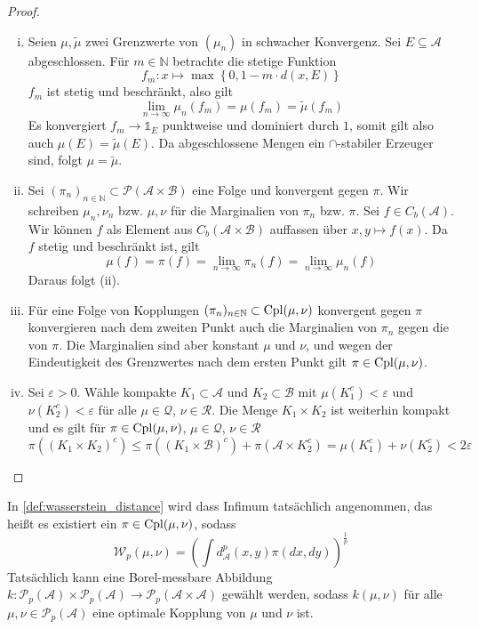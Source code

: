 \begin{proof}
\begin{enumerate}[(i)]
    \item Seien $\mu, \tilde{\mu}$ zwei Grenzwerte von $(\mu_n)$ in schwacher Konvergenz. Sei $E \subseteq \mathcal{A}$ abgeschlossen. Für $m \in \mathbb{N}$ betrachte die stetige Funktion 
    $$f_m: x \mapsto \max\left\{0, 1-m\cdot d(x,E)\right\}$$
    $f_m$ ist stetig und beschränkt, also gilt 
    $$\lim_{n \rightarrow \infty} \mu_n(f_m) = \mu(f_m) = \tilde{\mu}(f_m)$$
    Es konvergiert $f_m \rightarrow \mathds{1}_E$ punktweise und dominiert durch $1$, somit gilt also auch $\mu(E) =\tilde{\mu}(E)$. Da abgeschlossene Mengen ein $\cap$-stabiler Erzeuger sind, folgt $\mu=\tilde{\mu}$.

    \item Sei $(\pi_n)_{n\in\mathbb{N}} \subset \mathcal{P}(\mathcal{A}\times\mathcal{B})$ eine Folge und konvergent gegen $\pi$. Wir schreiben $\mu_n, \nu_n$ bzw. $\mu, \nu$ für die Marginalien von $\pi_n$ bzw. $\pi$. Sei $f\in C_b(\mathcal{A})$. Wir können $f$ als Element aus $C_b(\mathcal{A}\times\mathcal{B})$ auffassen über $x,y\mapsto f(x)$. Da $f$ stetig und beschränkt ist, gilt 
    $$\mu(f) = \pi(f) = \lim_{n\rightarrow \infty} \pi_n(f) = \lim_{n\rightarrow\infty} \mu_n(f)$$ 
    Daraus folgt (ii).

    \item Für eine Folge von Kopplungen $(\pi_n)_{n\in\mathbb{N}} \subset \operatorname{Cpl}(\mu,\nu)$ konvergent gegen $\pi$ konvergieren nach dem zweiten Punkt auch die Marginalien von $\pi_n$ gegen die von $\pi$. Die Marginalien sind aber konstant $\mu$ und $\nu$, und wegen der Eindeutigkeit des Grenzwertes nach dem ersten Punkt gilt $\pi \in \operatorname{Cpl}(\mu,\nu)$.

    \item Sei $\varepsilon > 0$. Wähle kompakte $K_1 \subset \mathcal{A}$ und $K_2 \subset \mathcal{B}$ mit $\mu(K_1^c)<\varepsilon$ und $\nu(K_2^c) < \varepsilon$ für alle $\mu \in \mathcal{Q}$, $\nu \in \mathcal{R}$. Die Menge $K_1 \times K_2$ ist weiterhin kompakt und es gilt für $\pi \in \operatorname{Cpl}(\mu,\nu)$, $\mu \in \mathcal{Q}$, $\nu\in\mathcal{R}$
    $$\pi((K_1\times K_2)^c) \leq \pi((K_1 \times \mathcal{B})^c) + \pi(\mathcal{A} \times K_2^c) = \mu(K_1^c) + \nu(K_2^c) < 2\varepsilon$$
\end{enumerate}
\end{proof}
\begin{lemma}\label{thm:optimal_coupling}
In \ref{def:wasserstein_distance} wird dass Infimum tatsächlich angenommen, das heißt es existiert ein $\pi \in \operatorname{Cpl}(\mu, \nu)$, sodass
$$\mathcal{W}_p(\mu, \nu) = \left( \int d^p_\mathcal{A}(x, y) \pi(dx, dy) \right)^{\frac{1}{p}}$$
Tatsächlich kann eine Borel-messbare Abbildung $k: \mathcal{P}_p(\mathcal{A}) \times \mathcal{P}_p(\mathcal{A}) \rightarrow \mathcal{P}_p(\mathcal{A}\times \mathcal{A})$ gewählt werden, sodass $k(\mu,\nu)$ für alle $\mu,\nu \in \mathcal{P}_p(\mathcal{A})$ eine optimale Kopplung von $\mu$ und $\nu$ ist.
\end{lemma}
